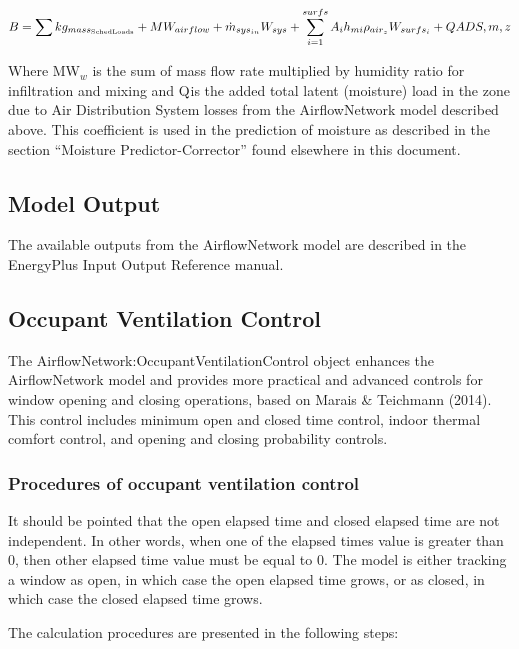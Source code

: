 \begin{equation}
B = \sum {k{g_{mas{s_{{\rm{Sched Loads}}}}}}}  + M{W_{airflow}} + {\dot m_{sy{s_{in}}}}{W_{sys}} + \sum\limits_{i = 1}^{surfs} {{A_i}{h_{mi}}{\rho_{ai{r_z}}}{W_{surf{s_i}}}}  + QADS,m,z
\end{equation}

Where MW\(_{w}\) is the sum of mass flow rate multiplied by humidity ratio for infiltration and mixing and Q\(_{ }\)is the added total latent (moisture) load in the zone due to Air Distribution System losses from the AirflowNetwork model described above. This coefficient is used in the prediction of moisture as described in the section ``Moisture Predictor-Corrector'' found elsewhere in this document.

\subsection{Model Output}\label{model-output}

The available outputs from the AirflowNetwork model are described in the EnergyPlus Input Output Reference manual.

\subsection{Occupant Ventilation Control}\label{occupant-ventilation-control}

The AirflowNetwork:OccupantVentilationControl object enhances the AirflowNetwork model and provides more practical and advanced controls for window opening and closing operations, based on Marais \& Teichmann (2014). This control includes minimum open and closed time control, indoor thermal comfort control, and opening and closing probability controls.

\subsubsection{Procedures of occupant ventilation control}\label{procedures-of-occupant-ventilation-control}

It should be pointed that the open elapsed time and closed elapsed time are not independent. In other words, when one of the elapsed times value is greater than 0, then other elapsed time value must be equal to 0. The model is either tracking a window as open, in which case the open elapsed time grows, or as closed, in which case the closed elapsed time grows.

The calculation procedures are presented in the following steps:


